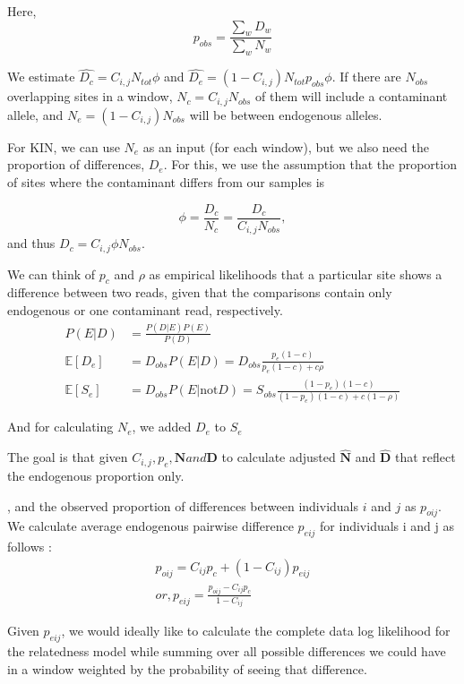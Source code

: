 \documentclass[12pt, letterpaper]{article}
\newcommand{\BD}{\mathbf{D}}
\newcommand{\BN}{\mathbf{N}}
\begin{document}
Here, $$p_{obs} = \frac{\sum_w D_w}{\sum_w N_w}$$


We estimate $\hat{D_c} = C_{i,j} N_{tot} \phi$ and $\hat{D_e} = (1-C_{i,j}) N_{tot} p_{obs}\phi$.
If there are $N_{obs}$ overlapping sites in a window, $N_{c} = C_{i,j}N_{obs}$ of them will include a contaminant allele, and $N_e = (1-C_{i,j})N_{obs}$ will be between endogenous alleles.

For KIN, we can use $N_e$ as an input (for each window), but we also need the proportion of differences, $D_e$. For this, we use the assumption that the proportion of sites where the contaminant differs from our samples is 

$$\phi = \frac{D_c}{N_c} = \frac{D_c}{C_{i,j} N_{obs}}, $$
and thus $D_c = C_{i,j} \phi N_{obs}$. 

We can think of $p_c$ and $\rho$ as empirical likelihoods that a particular site shows a difference between two reads, given that the comparisons contain only endogenous or one contaminant read, respectively. 
\begin{align}
    P(E|D) &= \frac{P(D|E)P(E)}{P(D)} \nonumber\\
    \mathbb{E}[D_e] &= D_{obs} P(E|D) = D_{obs}\frac{p_e (1-c)}{p_e(1-c) + c\rho}\\
    \mathbb{E}[S_e] &= D_{obs} P(E|\text{not} D) = S_{obs}\frac{(1-p_e)(1-c)}{(1-p_e)(1-c) + c(1-\rho)}
\end{align}

And for calculating $N_{e}$, we added $D_{e}$ to $S_{e}$    

The goal is that given $C_{i,j}, p_e, \BN and \BD$ to calculate adjusted $\hat{\BN}$ and $\hat{\BD}$ that reflect the endogenous proportion only.

, and the observed proportion of differences between individuals $i$ and $j$ as $p_{oij}$. We calculate average endogenous pairwise difference $p_{eij}$ for individuals i and j as follows \cite{noauthor_ancient_nodate}:
\begin{align}
    p_{oij} = C_{ij}  p_c + (1-C_{ij})  p_{eij}\\
    or, p_{eij} = \frac{p_{oij} - C_{ij}  p_c}{1-C_{ij}} 
\end{align}

Given $p_{eij}$, we would ideally like to calculate the complete data log likelihood for the relatedness model while summing over all possible differences we could have in a window weighted by the probability of seeing that difference. 
\end{document}
